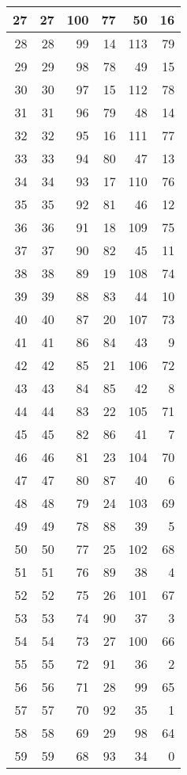 \begin{longtable}{|r|r|r|r|r|r|}
      \hline 
      27&27&100&77&50&16\\
      \hline 
      28&28&99&14&113&79\\
      \hline 
      29&29&98&78&49&15\\
      \hline 
      30&30&97&15&112&78\\
      \hline 
      31&31&96&79&48&14\\
      \hline 
      32&32&95&16&111&77\\
      \hline 
      33&33&94&80&47&13\\
      \hline 
      34&34&93&17&110&76\\
      \hline 
      35&35&92&81&46&12\\
      \hline 
      36&36&91&18&109&75\\
      \hline 
      37&37&90&82&45&11\\
      \hline 
      38&38&89&19&108&74\\
      \hline 
      39&39&88&83&44&10\\
      \hline 
      40&40&87&20&107&73\\
      \hline 
      41&41&86&84&43&9\\
      \hline 
      42&42&85&21&106&72\\
      \hline 
      43&43&84&85&42&8\\
      \hline 
      44&44&83&22&105&71\\
      \hline 
      45&45&82&86&41&7\\
      \hline 
      46&46&81&23&104&70\\
      \hline 
      47&47&80&87&40&6\\
      \hline 
      48&48&79&24&103&69\\
      \hline 
      49&49&78&88&39&5\\
      \hline 
      50&50&77&25&102&68\\
      \hline 
      51&51&76&89&38&4\\
      \hline 
      52&52&75&26&101&67\\
      \hline 
      53&53&74&90&37&3\\
      \hline 
      54&54&73&27&100&66\\
      \hline 
      55&55&72&91&36&2\\
      \hline 
      56&56&71&28&99&65\\
      \hline 
      57&57&70&92&35&1\\
      \hline 
      58&58&69&29&98&64\\
      \hline 
      59&59&68&93&34&0\\

\end{longtable}
